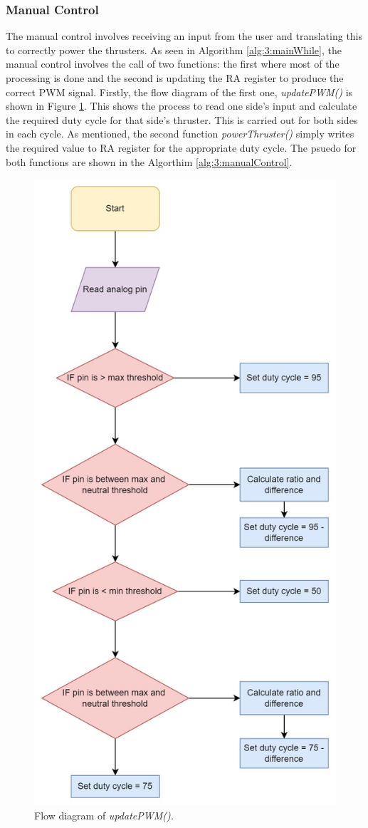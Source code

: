 	


\subsubsection{Manual Control}
The manual control involves receiving an input from the user and translating this to correctly power the thrusters. As seen in Algorithm \ref{alg:3:mainWhile}, the manual control involves the call of two functions: the first where most of the processing is done and the second is updating the RA register to produce the correct PWM signal. Firstly, the flow diagram of the first one, \emph{updatePWM()} is shown in Figure \ref{fig:3:updatePWM}. This shows the process to read one side's input and calculate the required duty cycle for that side's thruster. This is carried out for both sides in each cycle. As mentioned, the second function \emph{powerThruster()} simply writes the required value to RA register for the appropriate duty cycle. The psuedo for both functions are shown in the Algorthim \ref{alg:3:manualControl}.
\begin{figure}
	\begin{center}
		\includegraphics[width = 0.55\linewidth]{figures/UpdatePWM.jpg}
		\caption{Flow diagram of \emph{updatePWM().}}
		\label{fig:3:updatePWM}
	\end{center}
\end{figure}
